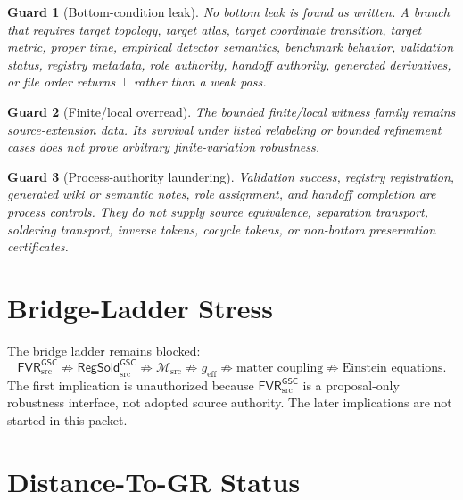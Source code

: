 \documentclass[11pt]{article}
\newcommand{\Msrc}{\mathcal{M}_{\mathrm{src}}}
\newcommand{\geff}{g_{\mathrm{eff}}}
\newcommand{\RegSold}{\mathsf{RegSold}_{\mathrm{src}}^{\mathsf{GSC}}}
\newcommand{\FVR}{\mathsf{FVR}_{\mathrm{src}}^{\mathsf{GSC}}}
\newcommand{\Bot}{\bot}
\newtheorem{guard}{Guard}
\begin{document}
\begin{guard}[Bottom-condition leak]
No bottom leak is found as written. A branch that requires target topology,
target atlas, target coordinate transition, target metric, proper time,
empirical detector semantics, benchmark behavior, validation status, registry
metadata, role authority, handoff authority, generated derivatives, or file
order returns \(\Bot\) rather than a weak pass.
\end{guard}

\begin{guard}[Finite/local overread]
The bounded finite/local witness family remains source-extension data. Its
survival under listed relabeling or bounded refinement cases does not prove
arbitrary finite-variation robustness.
\end{guard}

\begin{guard}[Process-authority laundering]
Validation success, registry registration, generated wiki or semantic notes,
role assignment, and handoff completion are process controls. They do not
supply source equivalence, separation transport, soldering transport, inverse
tokens, cocycle tokens, or non-bottom preservation certificates.
\end{guard}

\section{Bridge-Ladder Stress}

The bridge ladder remains blocked:
\[
  \FVR \nRightarrow \RegSold \nRightarrow \Msrc \nRightarrow \geff
  \nRightarrow \text{matter coupling}
  \nRightarrow \text{Einstein equations}.
\]
The first implication is unauthorized because \(\FVR\) is a proposal-only
robustness interface, not adopted source authority. The later implications
are not started in this packet.

\section{Distance-To-GR Status}
\end{document}
